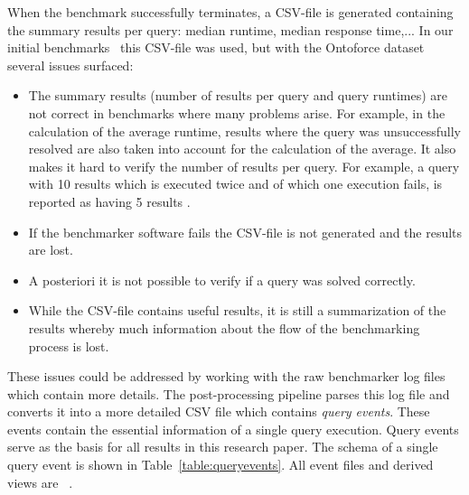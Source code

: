 When the benchmark successfully terminates, a CSV-file is generated containing the summary results per query: median runtime, median response time,...
In our initial benchmarks~\cite{de2016big} this CSV-file was used, but with the Ontoforce dataset several issues surfaced:

\begin{itemize}
	\item The summary results (number of results per query and query runtimes) are not correct in benchmarks where many problems arise. 
	For example, in the calculation of the average runtime, results where the query was unsuccessfully resolved are also taken into account for the calculation of the average. 
	It also makes it hard to verify the number of results per query. For example, a query with 10 results which is executed twice and of which one execution fails, is reported as having 5 results .
	\item If the benchmarker software fails the CSV-file is not generated and the results are lost.
	\item A posteriori it is not possible to verify if a query was solved correctly.
	\item While the CSV-file contains useful results, it is still a summarization of the results whereby much information about the flow of the benchmarking process is lost. 
\end{itemize}

These issues could be addressed by working with the raw benchmarker log files which contain more details.
The post-processing pipeline parses this log file and converts it into a more detailed CSV file which contains \emph{query events}. These events contain the essential information of a single query execution. Query events serve as the basis for all results in this research paper. The schema of a single query event is shown in Table~\ref{table:queryevents}. All event files and derived views are ~\cite{bmresults}.

